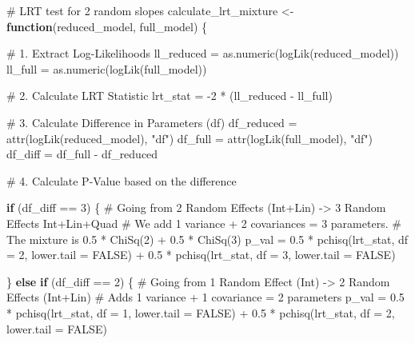 \documentclass[
  12pt,
]{article}
\newenvironment{Shaded}{\begin{snugshade}}{\end{snugshade}}
\newcommand{\AttributeTok}[1]{\textcolor[rgb]{0.40,0.45,0.13}{#1}}
\newcommand{\CommentTok}[1]{\textcolor[rgb]{0.37,0.37,0.37}{#1}}
\newcommand{\ConstantTok}[1]{\textcolor[rgb]{0.56,0.35,0.01}{#1}}
\newcommand{\ControlFlowTok}[1]{\textcolor[rgb]{0.00,0.23,0.31}{\textbf{#1}}}
\newcommand{\DecValTok}[1]{\textcolor[rgb]{0.68,0.00,0.00}{#1}}
\newcommand{\FloatTok}[1]{\textcolor[rgb]{0.68,0.00,0.00}{#1}}
\newcommand{\FunctionTok}[1]{\textcolor[rgb]{0.28,0.35,0.67}{#1}}
\newcommand{\NormalTok}[1]{\textcolor[rgb]{0.00,0.23,0.31}{#1}}
\newcommand{\OtherTok}[1]{\textcolor[rgb]{0.00,0.23,0.31}{#1}}
\newcommand{\SpecialCharTok}[1]{\textcolor[rgb]{0.37,0.37,0.37}{#1}}
\newcommand{\StringTok}[1]{\textcolor[rgb]{0.13,0.47,0.30}{#1}}
\begin{document}
\begin{Shaded}
\begin{Highlighting}[]
\CommentTok{\# LRT test for 2 random slopes}
\NormalTok{calculate\_lrt\_mixture }\OtherTok{\textless{}{-}} \ControlFlowTok{function}\NormalTok{(reduced\_model, full\_model) \{}
  
  \CommentTok{\# 1. Extract Log{-}Likelihoods}
\NormalTok{  ll\_reduced }\OtherTok{=} \FunctionTok{as.numeric}\NormalTok{(}\FunctionTok{logLik}\NormalTok{(reduced\_model))}
\NormalTok{  ll\_full }\OtherTok{=} \FunctionTok{as.numeric}\NormalTok{(}\FunctionTok{logLik}\NormalTok{(full\_model))}
  
  \CommentTok{\# 2. Calculate LRT Statistic}
\NormalTok{  lrt\_stat }\OtherTok{=} \SpecialCharTok{{-}}\DecValTok{2} \SpecialCharTok{*}\NormalTok{ (ll\_reduced }\SpecialCharTok{{-}}\NormalTok{ ll\_full)}
  
  \CommentTok{\# 3. Calculate Difference in Parameters (df)}
\NormalTok{  df\_reduced }\OtherTok{=} \FunctionTok{attr}\NormalTok{(}\FunctionTok{logLik}\NormalTok{(reduced\_model), }\StringTok{"df"}\NormalTok{)}
\NormalTok{  df\_full }\OtherTok{=} \FunctionTok{attr}\NormalTok{(}\FunctionTok{logLik}\NormalTok{(full\_model), }\StringTok{"df"}\NormalTok{)}
\NormalTok{  df\_diff }\OtherTok{=}\NormalTok{ df\_full }\SpecialCharTok{{-}}\NormalTok{ df\_reduced}
  
  \CommentTok{\# 4. Calculate P{-}Value based on the difference}
  
  \ControlFlowTok{if}\NormalTok{ (df\_diff }\SpecialCharTok{==} \DecValTok{3}\NormalTok{) \{}
    \CommentTok{\# Going from 2 Random Effects (Int+Lin) {-}\textgreater{} 3 Random Effects Int+Lin+Quad}
    \CommentTok{\# We add 1 variance + 2 covariances = 3 parameters.}
    \CommentTok{\# The mixture is 0.5 * ChiSq(2) + 0.5 * ChiSq(3)}
\NormalTok{    p\_val }\OtherTok{=} \FloatTok{0.5} \SpecialCharTok{*} \FunctionTok{pchisq}\NormalTok{(lrt\_stat, }\AttributeTok{df =} \DecValTok{2}\NormalTok{, }\AttributeTok{lower.tail =} \ConstantTok{FALSE}\NormalTok{) }\SpecialCharTok{+} 
      \FloatTok{0.5} \SpecialCharTok{*} \FunctionTok{pchisq}\NormalTok{(lrt\_stat, }\AttributeTok{df =} \DecValTok{3}\NormalTok{, }\AttributeTok{lower.tail =} \ConstantTok{FALSE}\NormalTok{)}
    
\NormalTok{  \} }\ControlFlowTok{else} \ControlFlowTok{if}\NormalTok{ (df\_diff }\SpecialCharTok{==} \DecValTok{2}\NormalTok{) \{}
    \CommentTok{\# Going from 1 Random Effect (Int) {-}\textgreater{} 2 Random Effects (Int+Lin)}
    \CommentTok{\# Adds 1 variance + 1 covariance = 2 parameters}
\NormalTok{    p\_val }\OtherTok{=} \FloatTok{0.5} \SpecialCharTok{*} \FunctionTok{pchisq}\NormalTok{(lrt\_stat, }\AttributeTok{df =} \DecValTok{1}\NormalTok{, }\AttributeTok{lower.tail =} \ConstantTok{FALSE}\NormalTok{) }\SpecialCharTok{+} 
      \FloatTok{0.5} \SpecialCharTok{*} \FunctionTok{pchisq}\NormalTok{(lrt\_stat, }\AttributeTok{df =} \DecValTok{2}\NormalTok{, }\AttributeTok{lower.tail =} \ConstantTok{FALSE}\NormalTok{)}
    

\end{Highlighting}
\end{Shaded}
\end{document}
